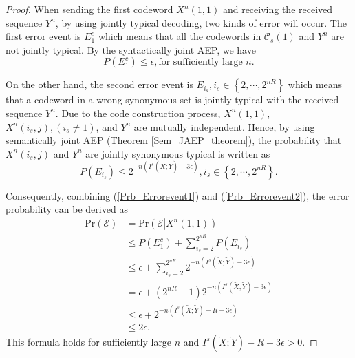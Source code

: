 \documentclass[12pt, draftclsnofoot,onecolumn]{IEEEtran}
\begin{document}
\begin{proof}
When sending the first codeword $X^n(1,1)$ and receiving the received sequence $Y^n$, by using jointly typical decoding, two kinds of error will occur. The first error event is $E_1^c$ which means that all the codewords in $\mathcal{C}_s(1)$ and $Y^n$ are not jointly typical. By the syntactically joint AEP, we have
\begin{equation}\label{Prb_Errorevent1}
P(E_1^c)\leq \epsilon, \text{for sufficiently large }n.
\end{equation}

On the other hand, the second error event is $E_{i_s},i_s\in \left\{2,\cdots,2^{nR}\right\}$ which means that a codeword in a wrong synonymous set is jointly typical with the received sequence $Y^n$. Due to the code construction process, $X^n(1,1)$, $X^n(i_s,j),(i_s\neq 1)$, and $Y^n$ are mutually independent. Hence, by using semantically joint AEP (Theorem \ref{Sem_JAEP_theorem}), the probability that $X^n(i_s,j)$ and $Y^n$ are jointly synonymous typical is written as
\begin{equation}\label{Prb_Errorevent2}
P(E_{i_s})\leq 2^{-n(I^s(\tilde{X};\tilde{Y})-3\epsilon)}, i_s\in \left\{2,\cdots,2^{nR}\right\}.
\end{equation}

Consequently, combining (\ref{Prb_Errorevent1}) and (\ref{Prb_Errorevent2}), the error probability can be derived as
\begin{equation}
\begin{aligned}
\text{Pr}(\mathcal{E})&=\text{Pr}\left(\mathcal{E}\left|X^{n}(1,1)\right.\right)\\
                                 &\leq P(E_{1}^c) + \sum_{i_s=2}^{2^{nR}}P(E_{i_s})\\
                                 &\leq \epsilon+\sum_{i_s=2}^{2^{nR}}2^{-n(I^s(\tilde{X};\tilde{Y})-3\epsilon)}\\
                                 & = \epsilon+\left(2^{nR}-1\right)2^{-n(I^s(\tilde{X};\tilde{Y})-3\epsilon)}\\
                                 &\leq \epsilon+2^{-n\left(I^s(\tilde{X};\tilde{Y})-R-3\epsilon\right)}\\
                                 &\leq 2\epsilon.
\end{aligned}
\end{equation}
This formula holds for sufficiently large $n$ and $I^s(\tilde{X};\tilde{Y})-R-3\epsilon>0$.


\end{proof}
\end{document}

